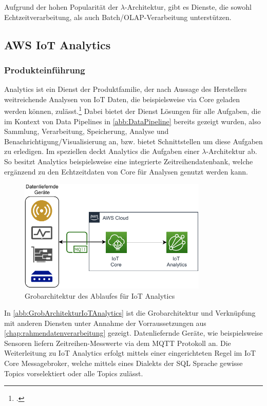 Aufgrund der hohen Popularität der $\lambda$-Architektur, gibt es Dienste, die sowohl Echtzeitverarbeitung, als auch Batch/\ac{OLAP}-Verarbeitung unterstützen.

\subsection{AWS IoT Analytics} \label{productselection:iotanalytics}

\subsubsection{Produkteinführung}

\AWSIOT Analytics ist ein Dienst der \AWSIOT Produktfamilie, der nach Aussage des Herstellers weitreichende Analysen von \ac{IoT} Daten, die beispielsweise via \AWSIOT Core geladen werden können, zulässt.\footcite[Vgl. auch im Folgenden][]{AmazonWebServicesInc..o.J.c} Dabei bietet der Dienst Lösungen für alle Aufgaben, die im Kontext von Data Pipelines in \autoref{abb:DataPipeline} bereits gezeigt wurden, also Sammlung, Verarbeitung, Speicherung, Analyse und Benachrichtigung/Visualisierung an, bzw. bietet Schnittstellen um diese Aufgaben zu erledigen. Im speziellen deckt \AWSIOT Analytics die Aufgaben einer $\lambda$-Architektur ab. So besitzt \AWSIOT Analytics beispielsweise eine integrierte Zeitreihendatenbank, welche ergänzend zu den Echtzeitdaten von \AWSIOT Core für Analysen genutzt werden kann.
\begin{figure}[H]
\centering
\includegraphics[width=0.8\textwidth]{graphics/IoT-Analytics-general.pdf}
\caption{Grobarchitektur des Ablaufes für IoT Analytics}
\label{abb:GrobArchitekturIoTAnalytics}
\end{figure}
In \autoref{abb:GrobArchitekturIoTAnalytics} ist die Grobarchitektur und Verknüpfung mit anderen Diensten unter Annahme der Vorraussetzungen aus \autoref{chap:rahmendatenverarbeitung} gezeigt. Datenliefernde Geräte, wie beispielsweise Sensoren liefern Zeitreihen-Messwerte via dem \ac{MQTT} Protokoll an. Die Weiterleitung zu IoT Analytics erfolgt mittels einer eingerichteten Regel im \ac{IoT} Core Messagebroker, welche mittels eines Dialekts der SQL Sprache gewisse Topics vorselektiert oder alle Topics zulässt.

